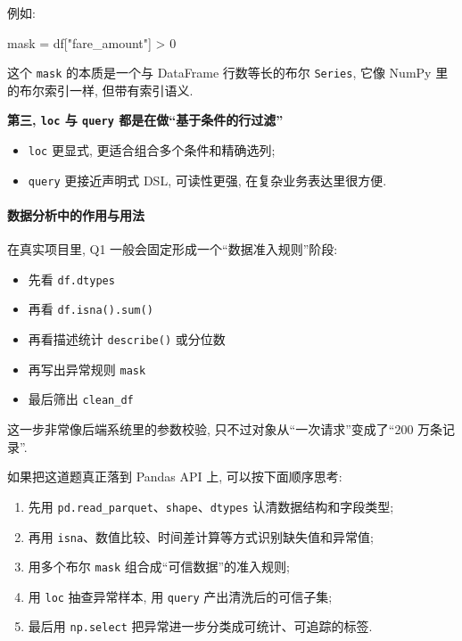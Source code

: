 \documentclass[11pt]{article}
\providecommand{\tightlist}{%
      \setlength{\itemsep}{0pt}\setlength{\parskip}{0pt}}
\newenvironment{Shaded}{}{}
\newcommand{\DecValTok}[1]{\textcolor[rgb]{0.25,0.63,0.44}{{#1}}}
\newcommand{\StringTok}[1]{\textcolor[rgb]{0.25,0.44,0.63}{{#1}}}
\newcommand{\NormalTok}[1]{{#1}}
\newcommand{\OperatorTok}[1]{\textcolor[rgb]{0.40,0.40,0.40}{{#1}}}
\begin{document}
例如:

\begin{Shaded}
\begin{Highlighting}[]
\NormalTok{mask }\OperatorTok{=}\NormalTok{ df[}\StringTok{"fare\_amount"}\NormalTok{] }\OperatorTok{\textgreater{}} \DecValTok{0}
\end{Highlighting}
\end{Shaded}

这个 \texttt{mask} 的本质是一个与 DataFrame 行数等长的布尔
\texttt{Series}, 它像 NumPy 里的布尔索引一样, 但带有索引语义.

\textbf{第三, \texttt{loc} 与 \texttt{query}
都是在做``基于条件的行过滤''}

\begin{itemize}
\tightlist
\item
  \texttt{loc} 更显式, 更适合组合多个条件和精确选列;
\item
  \texttt{query} 更接近声明式 DSL, 可读性更强, 在复杂业务表达里很方便.
\end{itemize}

    \paragraph{数据分析中的作用与用法}\label{ux6570ux636eux5206ux6790ux4e2dux7684ux4f5cux7528ux4e0eux7528ux6cd5}

    在真实项目里, Q1 一般会固定形成一个``数据准入规则''阶段:

\begin{itemize}
\tightlist
\item
  先看 \texttt{df.dtypes}
\item
  再看 \texttt{df.isna().sum()}
\item
  再看描述统计 \texttt{describe()} 或分位数
\item
  再写出异常规则 \texttt{mask}
\item
  最后筛出 \texttt{clean\_df}
\end{itemize}

这一步非常像后端系统里的参数校验, 只不过对象从``一次请求''变成了``200
万条记录''.

如果把这道题真正落到 Pandas API 上, 可以按下面顺序思考:

\begin{enumerate}
\def\labelenumi{\arabic{enumi}.}
\tightlist
\item
  先用 \texttt{pd.read\_parquet}、\texttt{shape}、\texttt{dtypes}
  认清数据结构和字段类型;
\item
  再用 \texttt{isna}、数值比较、时间差计算等方式识别缺失值和异常值;
\item
  用多个布尔 \texttt{mask} 组合成``可信数据''的准入规则;
\item
  用 \texttt{loc} 抽查异常样本, 用 \texttt{query} 产出清洗后的可信子集;
\item
  最后用 \texttt{np.select} 把异常进一步分类成可统计、可追踪的标签.
\end{enumerate}
\end{document}
